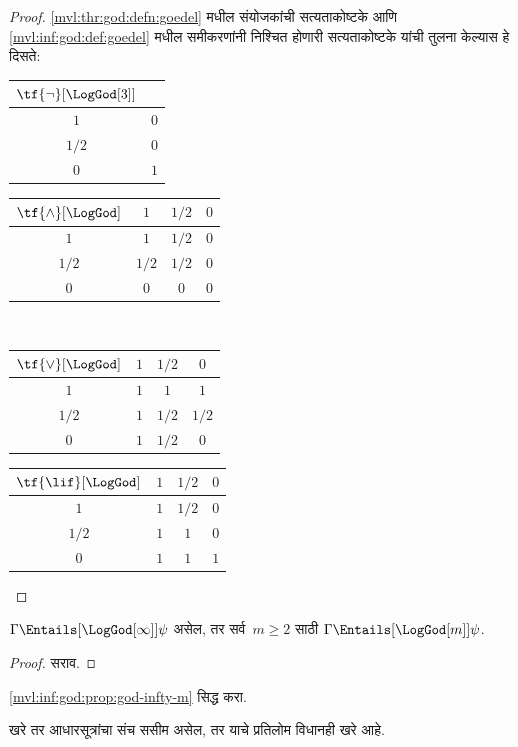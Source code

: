 \begin{proof}
  \ref{mvl:thr:god:defn:goedel} मधील संयोजकांची
  सत्यताकोष्टके आणि \ref{mvl:inf:god:def:goedel} मधील
  समीकरणांनी निश्चित होणारी सत्यताकोष्टके यांची तुलना
  केल्यास हे दिसते:
  \begin{center}
    \begin{tabular}{c|c}
      $\tf{\lnot}[\LogGod[3]]$ & \\
      \hline
      $1$ & $0$ \\
      $1/2$ & $0$ \\
      $0$ & $1$
    \end{tabular}
    \quad
    \begin{tabular}{c|ccc}
      $\tf{\land}[\LogGod]$ & $1$ & $1/2$ & $0$ \\
      \hline
      $1$ & $1$ & $1/2$ & $0$ \\
      $1/2$ & $1/2$ & $1/2$ & $0$\\
      $0$ & $0$ & $0$ & $0$
    \end{tabular}
    \\[2ex]
    \begin{tabular}{c|ccc}
      $\tf{\lor}[\LogGod]$ & $1$ & $1/2$ & $0$ \\
      \hline
      $1$ & $1$ & $1$ & $1$ \\
      $1/2$ & $1$ & $1/2$ & $1/2$ \\
      $0$ & $1$ & $1/2$ & $0$
    \end{tabular}
    \quad
    \begin{tabular}{c|ccc}
      $\tf{\lif}[\LogGod]$ & $1$ & $1/2$ & $0$ \\
      \hline
      $1$ & $1$ & $1/2$ & $0$ \\
      $1/2$ & $1$ & $1$ & $0$  \\
      $0$ & $1$ & $1$ & $1$
    \end{tabular}
  \end{center}
\end{proof}
\begin{prop}\label{mvl:inf:god:prop:god-infty-m}
  $\Gamma \Entails[\LogGod[\infty]] \psi$ असेल, तर
  सर्व~$m \ge 2$ साठी $\Gamma \Entails[\LogGod[m]] \psi$.
\end{prop}
\begin{proof}
  सराव.
\end{proof}
\begin{prob}
  \ref{mvl:inf:god:prop:god-infty-m} सिद्ध करा.
\end{prob}
खरे तर आधारसूत्रांचा संच ससीम असेल, तर याचे प्रतिलोम
विधानही खरे आहे.

